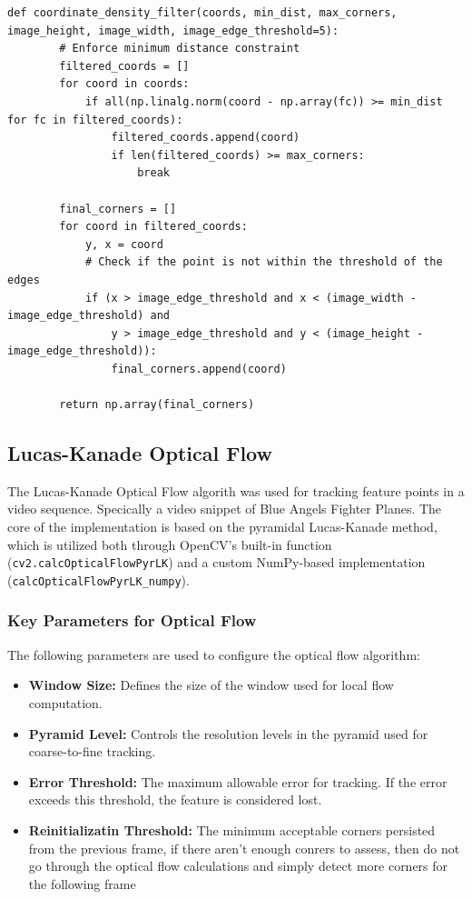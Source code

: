 \documentclass[11pt, conference, letterpaper]{IEEEtran}
\begin{document}
\begin{lstlisting}[style=python, caption={Corner Density Filter}, label={lst:corner_filter}]
    def coordinate_density_filter(coords, min_dist, max_corners, image_height, image_width, image_edge_threshold=5):
        # Enforce minimum distance constraint
        filtered_coords = []
        for coord in coords:
            if all(np.linalg.norm(coord - np.array(fc)) >= min_dist for fc in filtered_coords):
                filtered_coords.append(coord)
                if len(filtered_coords) >= max_corners:
                    break

        final_corners = []    
        for coord in filtered_coords:
            y, x = coord
            # Check if the point is not within the threshold of the edges
            if (x > image_edge_threshold and x < (image_width - image_edge_threshold) and
                y > image_edge_threshold and y < (image_height - image_edge_threshold)):
                final_corners.append(coord)

        return np.array(final_corners)
\end{lstlisting}
\twocolumn





\subsection{Lucas-Kanade Optical Flow}

The Lucas-Kanade Optical Flow algorith was used for tracking feature points in a video sequence. Specically a video snippet of Blue Angels Fighter Planes. The core of the implementation is based on the pyramidal Lucas-Kanade method, which is utilized both through OpenCV's built-in function (\texttt{cv2.calcOpticalFlowPyrLK}) and a custom NumPy-based implementation (\texttt{calcOpticalFlowPyrLK\_numpy}).

\subsubsection{Key Parameters for Optical Flow}
The following parameters are used to configure the optical flow algorithm:
\begin{itemize}
    \item \textbf{Window Size:} Defines the size of the window used for local flow computation.
    \item \textbf{Pyramid Level:} Controls the resolution levels in the pyramid used for coarse-to-fine tracking.
    \item \textbf{Error Threshold:} The maximum allowable error for tracking. If the error exceeds this threshold, the feature is considered lost.
    \item \textbf{Reinitializatin Threshold:} The minimum acceptable corners persisted from the previous frame, if there aren't enough conrers to assess, then do not go through the optical flow calculations and simply detect more corners for the following frame
\end{itemize}
\bigskip
\end{document}
